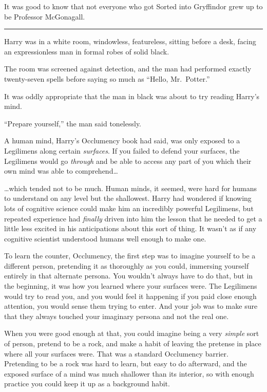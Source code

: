 It was good to know that not everyone who got Sorted into Gryffindor
grew up to be Professor McGonagall.

\begin{center}\rule{3in}{0.4pt}\end{center}

Harry was in a white room, windowless, featureless, sitting before a
desk, facing an expressionless man in formal robes of solid black.

The room was screened against detection, and the man had performed
exactly twenty-seven spells before saying so much as ``Hello,
Mr.~Potter.''

It was oddly appropriate that the man in black was about to try reading
Harry's mind.

``Prepare yourself,'' the man said tonelessly.

A human mind, Harry's Occlumency book had said, was only exposed to a
Legilimens along certain \emph{surfaces}. If you failed to defend your
surfaces, the Legilimens would go \emph{through} and be able to access
any part of you which their own mind was able to comprehend\ldots{}

\ldots{}which tended not to be much. Human minds, it seemed, were hard
for humans to understand on any level but the shallowest. Harry had
wondered if knowing lots of cognitive science could make him an
incredibly powerful Legilimens, but repeated experience had
\emph{finally} driven into him the lesson that he needed to get a little
less excited in his anticipations about this sort of thing. It wasn't as
if any cognitive scientist understood humans well enough to make one.

To learn the counter, Occlumency, the first step was to imagine yourself
to be a different person, pretending it as thoroughly as you could,
immersing yourself entirely in that alternate persona. You wouldn't
always have to do that, but in the beginning, it was how you learned
where your surfaces were. The Legilimens would try to read you, and you
would feel it happening if you paid close enough attention, you would
sense them trying to enter. And your job was to make sure that they
always touched your imaginary persona and not the real one.

When you were good enough at that, you could imagine being a very
\emph{simple} sort of person, pretend to be a rock, and make a habit of
leaving the pretense in place where all your surfaces were. That was a
standard Occlumency barrier. Pretending to be a rock was hard to learn,
but easy to do afterward, and the exposed surface of a mind was much
shallower than its interior, so with enough practice you could keep it
up as a background habit.

